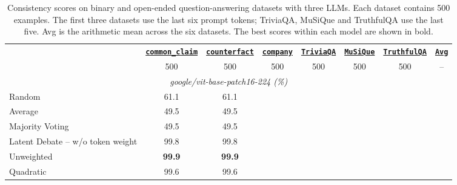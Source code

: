 \begin{table}[tp]
    \centering
    \tiny
    \setlength{\tabcolsep}{2.2mm}
    \begin{threeparttable}
        \begin{tabular}{lccccccc}
            \toprule
            & \textbf{\underline{\texttt{common\_claim}}} & \textbf{\underline{\texttt{counterfact}}} & \textbf{\underline{\texttt{company}}} & \textbf{\underline{\texttt{TriviaQA}}} & \textbf{\underline{\texttt{MuSiQue}}} & \textbf{\underline{\texttt{TruthfulQA}}} & \textbf{\underline{\texttt{Avg}}} \\
            & 500 & 500 & 500 & 500 & 500 & 500 & -- \\
            \midrule
            \multicolumn{8}{c}{\textit{google/vit-base-patch16-224 (\%)}} \\
            \midrule
            Random & 61.1 & 61.1 \\
            Average & 49.5 & 49.5 \\
            Majority Voting & 49.5 & 49.5 \\
            Latent Debate -- w/o token weight & 99.8 & 99.8 \\
            Unweighted & \textbf{99.9} & \textbf{99.9} \\
            Quadratic & 99.6 & 99.6 \\
            \bottomrule
        \end{tabular}
        \caption{Consistency scores on binary and open-ended question-answering datasets with three LLMs. Each dataset contains 500 examples. The first three datasets use the last six prompt tokens; TriviaQA, MuSiQue and TruthfulQA use the last five. Avg is the arithmetic mean across the six datasets. The best scores within each model are shown in bold.}
        \label{tab:correlation}
    \end{threeparttable}
    \vspace{-10pt}
\end{table}
